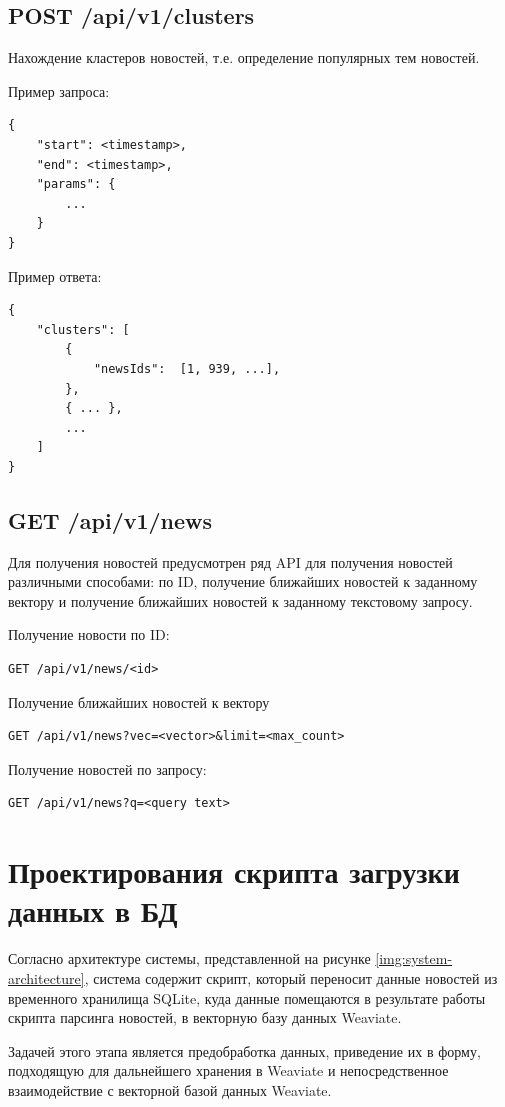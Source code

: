\subsection{POST /api/v1/clusters}
Нахождение кластеров новостей, т.е. определение популярных тем новостей.

Пример запроса:
\begin{lstlisting}
{
    "start": <timestamp>,
    "end": <timestamp>,
    "params": {
        ...
    }
}
\end{lstlisting}

Пример ответа:
\begin{lstlisting}
{
    "clusters": [
        {
            "newsIds":  [1, 939, ...],
        },
        { ... },
        ...
    ]
}
\end{lstlisting}

\subsection{GET /api/v1/news}
Для получения новостей предусмотрен ряд API для получения новостей различными способами: по ID, получение ближайших новостей к заданному вектору и получение ближайших новостей к заданному текстовому запросу.

Получение новости по ID:
\begin{lstlisting}
GET /api/v1/news/<id>
\end{lstlisting}


Получение ближайших новостей к вектору
\begin{lstlisting}
GET /api/v1/news?vec=<vector>&limit=<max_count>
\end{lstlisting}

Получение новостей по запросу:
\begin{lstlisting}
GET /api/v1/news?q=<query text>
\end{lstlisting}

\section{Проектирования скрипта загрузки данных в БД}

Согласно архитектуре системы, представленной на рисунке \ref{img:system-architecture}, система содержит скрипт, который переносит данные новостей из временного хранилища SQLite, куда данные помещаются в результате работы скрипта парсинга новостей, в векторную базу данных Weaviate.

Задачей этого этапа является предобработка данных, приведение их в форму, подходящую для дальнейшего хранения в Weaviate и непосредственное взаимодействие с векторной базой данных Weaviate.

